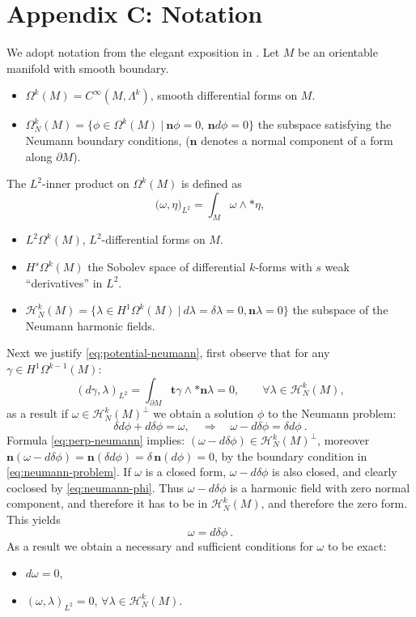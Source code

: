 \documentclass[12pt]{article}
\newcommand{\no}{\noindent}
\begin{document}
\section*{Appendix C: Notation}
 We adopt notation from the elegant exposition in \cite{Schwarz95}. Let $M$ be an orientable manifold with smooth boundary.
\begin{itemize}
\item[] $\Omega^k(M)=C^\infty(M,\Lambda^k)$, smooth differential forms on $M$.
\item[] $\Omega^k_N(M)=\{\phi\in \Omega^k(M)\ |\ \mathbf{n}\phi=0,\, \mathbf{n}d\phi=0\}$ the subspace satisfying the Neumann boundary conditions, ($\mathbf{n}$ denotes a normal component of a form along $\partial M$).
\end{itemize}
\no The $L^2$-inner product on $\Omega^k(M)$ is defined as 
 \[
  \bigl( \omega,\eta\bigr)_{L^2}=\int_M \omega\wedge\ast \eta,
 \] 
\begin{itemize}
\item[] $L^2\Omega^k(M)$, $L^2$-differential forms on $M$.
\item[] $H^s\Omega^k(M)$ the Sobolev space of differential $k$-forms with $s$ weak ``derivatives'' in $L^2$.
\item[] $\mathcal{H}^k_N(M)=\{\lambda\in H^1\Omega^k(M)\ |\ d\lambda=\delta\lambda=0, \mathbf{n}\lambda=0\}$ the subspace of the Neumann harmonic fields.
\end{itemize}


\no Next we justify \eqref{eq:potential-neumann}, first observe that for any $\gamma\in H^1\Omega^{k-1}(M)$:
\begin{equation}\label{eq:perp-neumann}
 (d\gamma,\lambda)_{L^2}=\int_{\partial M} \mathbf{t}\gamma\wedge\ast\mathbf{n}\lambda=0,\qquad \forall \lambda\in \mathcal{H}^k_N(M),
\end{equation}
as a result if $\omega \in \mathcal{H}^k_N(M)^\perp$ we obtain a solution $\phi$ to the Neumann problem:
\begin{equation}\label{eq:neumann-phi}
 \delta d\phi+d\delta\phi=\omega,\quad \Rightarrow\quad \omega-d\delta\phi=\delta d\phi\ .
\end{equation}
Formula \eqref{eq:perp-neumann} implies: $(\omega-d\delta\phi)\in \mathcal{H}^k_N(M)^\perp$, moreover
$\mathbf{n}(\omega-d\delta\phi)=\mathbf{n}(\delta d\phi)=\delta\,\mathbf{n}(d\phi)=0$, by the boundary condition in \eqref{eq:neumann-problem}. If $\omega$ is a closed form, $\omega-d\delta\phi$ is also closed,
and clearly coclosed by \eqref{eq:neumann-phi}. Thus $\omega-d\delta\phi$ is a harmonic field with zero normal component, and therefore it has to be in $\mathcal{H}^k_N(M)$, and therefore the zero form. This yields 
\[
 \omega=d\delta\phi\ .
\]
As a result we obtain a necessary and sufficient conditions for $\omega$ to be exact:
 \begin{itemize}
 \item[$(i)$] $d\omega=0$,
 \item[$(ii)$] $(\omega,\lambda)_{L^2}=0$, $\forall\lambda\in \mathcal{H}^k_N(M)$.
\end{itemize}
\end{document}
